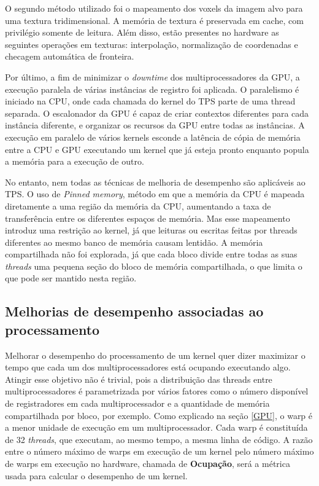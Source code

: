 O segundo método utilizado foi o mapeamento dos voxels da imagem alvo para uma
textura tridimensional. A memória de textura é preservada em cache, com privilégio
somente de leitura. Além disso, estão presentes no hardware as seguintes operações
em texturas: interpolação, normalização de coordenadas e checagem automática de
fronteira.

Por último, a fim de minimizar o \textit{downtime} dos multiprocessadores da GPU, a
execução paralela de várias instâncias de registro foi aplicada. O paralelismo
é iniciado na CPU, onde cada chamada do kernel do TPS parte de uma thread separada.
O escalonador da GPU é capaz de criar contextos diferentes para cada instância
diferente, e organizar os recursos da GPU entre todas as instâncias. A execução
em paralelo de vários kernels esconde a latência de cópia de memória entre a
CPU e GPU executando um kernel que já esteja pronto enquanto popula a memória
para a execução de outro.

No entanto, nem todas as técnicas de melhoria de desempenho são aplicáveis ao
TPS. O uso de \textit{Pinned memory}, método em que a memória da CPU é mapeada
diretamente a uma região da memória da CPU, aumentando a taxa de transferência entre
os diferentes espaços de memória. Mas esse mapeamento introduz uma restrição ao
kernel, já que leituras ou escritas feitas por threads diferentes ao mesmo banco
de memória causam lentidão. A memória compartilhada não foi explorada, já que
cada bloco divide entre todas as suas \textit{threads} uma pequena seção do
bloco de memória compartilhada, o que limita o que pode ser mantido nesta região.

\subsection{Melhorias de desempenho associadas ao processamento}

  Melhorar o desempenho do processamento de um kernel quer dizer maximizar o
tempo que cada um dos multiprocessadores está ocupando executando algo. Atingir
esse objetivo não é trivial, pois a distribuição das threads entre multiprocessadores
é parametrizada por vários fatores como o número disponível de registradores
em cada multiprocessador e a quantidade de memória compartilhada por bloco, por exemplo.
Como explicado na seção \ref{GPU}, o warp é a menor unidade de execução em um
multiprocessador. Cada warp é constituída de 32 \textit{threads}, que executam,
ao mesmo tempo, a mesma linha de código. A razão entre o número máximo de warps
em execução de um kernel pelo número máximo de warps em execução no hardware,
chamada de \textbf{Ocupação}, será a métrica usada para calcular o desempenho
de um kernel.

